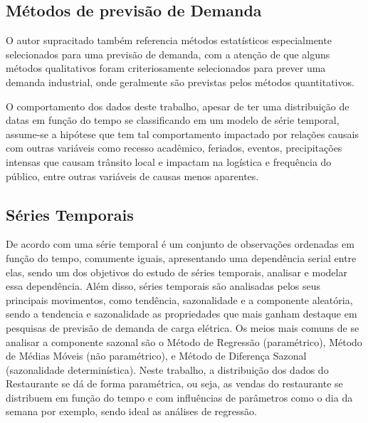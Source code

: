 \documentclass[	12pt, Times, openright, twoside, a4paper, english, brazil]{abntex2}
\begin{document}
        \subsection{Métodos de previsão de Demanda}
          O autor supracitado também referencia métodos estatísticos especialmente selecionados para uma previsão de demanda, com a atenção de que alguns métodos qualitativos foram criteriosamente selecionados para prever uma demanda industrial, onde geralmente são previstas pelos métodos quantitativos.

          O comportamento dos dados deste trabalho, apesar de ter uma distribuição de datas em função do tempo se classificando em um modelo de série temporal, assume-se a hipótese que tem tal comportamento impactado por relações causais com outras variáveis como recesso acadêmico, feriados, eventos, precipitações intensas que causam trânsito local e impactam na logística e frequência do público, entre outras variáveis de causas menos aparentes.

          \begin{figure}[H]
          \end{figure}

        \subsection{Séries Temporais}
          De acordo com  \cite{Morettin1987} uma série temporal é um conjunto de observações ordenadas em função do tempo, comumente iguais, apresentando uma dependência serial entre elas, sendo um dos objetivos do estudo de séries temporais, analisar e modelar essa dependência. Além disso, séries temporais são analisadas pelos seus principais movimentos, como tendência, sazonalidade e a componente aleatória, sendo a tendencia e sazonalidade as propriedades que mais ganham destaque em pesquisas de previsão de demanda de carga elétrica. Os meios mais comuns de se analisar a componente sazonal são o Método de Regressão (paramétrico), Método de Médias Móveis (não paramétrico), e Método de Diferença Sazonal (sazonalidade determinística).  Neste trabalho, a distribuição dos dados do Restaurante se dá de forma paramétrica, ou seja, as vendas do restaurante se distribuem em função do tempo e com influências de parâmetros como o dia da semana por exemplo, sendo ideal as análises de regressão. 
\end{document}
